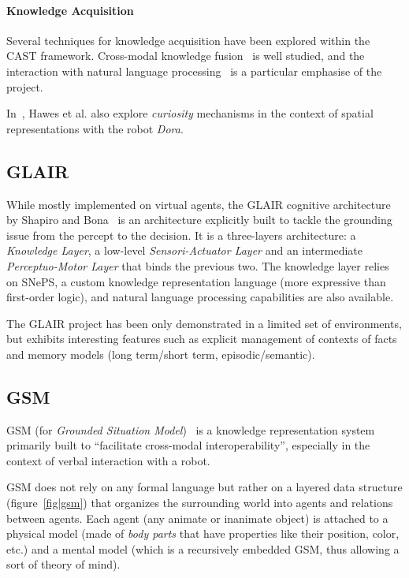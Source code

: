 \paragraph{Knowledge Acquisition} Several techniques for knowledge acquisition
have been explored within the CAST framework. Cross-modal knowledge
fusion~\cite{Hawes2007a} is well studied, and the interaction with natural
language processing~\cite{Kruijff2010, Kruijff2010a} is a particular emphasise
of the project.

In~\cite{Hawes2011}, Hawes et al. also explore \emph{curiosity} mechanisms in
the context of spatial representations with the robot \emph{Dora}.


\subsection{GLAIR}
\label{sect|glair}


While mostly implemented on virtual agents, the GLAIR cognitive architecture by
Shapiro and Bona~\cite{Shapiro2009} is an architecture explicitly built to
tackle the grounding issue from the percept to the decision. It is a
three-layers architecture: a \emph{Knowledge Layer}, a low-level
\emph{Sensori-Actuator Layer} and an intermediate \emph{Perceptuo-Motor Layer}
that binds the previous two.  The knowledge layer relies on SNePS, a custom
knowledge representation language (more expressive than first-order logic), and
natural language processing capabilities are also available.

The GLAIR project has been only demonstrated in a limited set of
environments, but exhibits interesting features such as explicit management
of contexts of facts and memory models (long term/short term,
episodic/semantic).


\subsection{GSM}
\label{sect|gsm}

GSM (for \emph{Grounded Situation Model})~\cite{Mavridis2006} is a knowledge
representation system primarily built to ``facilitate cross-modal
interoperability'',  especially in the context of verbal interaction with a
robot.

GSM does not rely on any formal language but rather on a layered data structure
(figure~\ref{fig|gsm}) that organizes the surrounding world into agents and
relations between agents.  Each agent (any animate or inanimate object) is
attached to a physical model (made of \emph{body parts} that have properties
like their position, color, etc.) and a mental model (which is a recursively
embedded GSM, thus allowing a sort of theory of mind).

